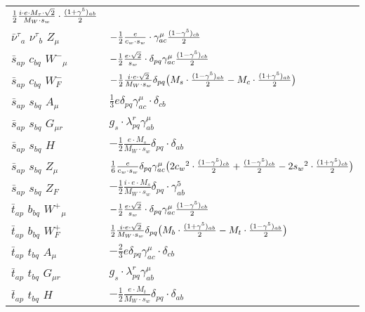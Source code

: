 \begin{center}
\begin{tabular}{|l|l|}
	$\frac{1}{2}\frac{ i \cdot e \cdot M_{\tau} \cdot\sqrt{2}}{ M_W \cdot s_w}\cdot {(1+\gamma^5)_{a b}\over 2} $\\[2mm]
$\bar{\nu}^\tau{}_{a }$ \phantom{-} $\nu^\tau{}_{b }$ \phantom{-} ${Z}_{\mu }$ \phantom{-}  &
	$-\frac{1}{2}\frac{ e}{ c_w \cdot s_w}\cdot \gamma_{a c}^\mu {(1-\gamma^5)_{c b}\over 2} $\\[2mm]
$\bar{s}{}_{a p }$ \phantom{-} $c{}_{b q }$ \phantom{-} $W^-{}_{\mu }$ \phantom{-}  &
	$-\frac{1}{2}\frac{ e \cdot\sqrt{2}}{ s_w}\cdot \delta_{p q} \gamma_{a c}^\mu {(1-\gamma^5)_{c b}\over 2} $\\[2mm]
$\bar{s}{}_{a p }$ \phantom{-} $c{}_{b q }$ \phantom{-} $W^-_F{}_{}$ \phantom{-}  &
	$-\frac{1}{2}\frac{ i \cdot e \cdot\sqrt{2}}{ M_W \cdot s_w}\delta_{p q} \big( M_s\cdot {(1-\gamma^5)_{a b}\over 2} - M_c\cdot {(1+\gamma^5)_{a b}\over 2} \big)$\\[2mm]
$\bar{s}{}_{a p }$ \phantom{-} $s{}_{b q }$ \phantom{-} ${A}_{\mu }$ \phantom{-}  &
	$\frac{1}{3} e\delta_{p q} \gamma_{a c}^\mu \cdot \delta_{c b} $\\[2mm]
$\bar{s}{}_{a p }$ \phantom{-} $s{}_{b q }$ \phantom{-} ${G}_{\mu r }$ \phantom{-}  &
	$ g_s\cdot \lambda_{p q}^r \gamma_{a b}^\mu $\\[2mm]
$\bar{s}{}_{a p }$ \phantom{-} $s{}_{b q }$ \phantom{-} ${H}_{}$ \phantom{-}  &
	$-\frac{1}{2}\frac{ e \cdot M_s}{ M_W \cdot s_w}\delta_{p q} \cdot \delta_{a b} $\\[2mm]
$\bar{s}{}_{a p }$ \phantom{-} $s{}_{b q }$ \phantom{-} ${Z}_{\mu }$ \phantom{-}  &
	$\frac{1}{6}\frac{ e}{ c_w \cdot s_w}\delta_{p q} \gamma_{a c}^\mu \big(2 c_w{}^2 \cdot {(1-\gamma^5)_{c b}\over 2} +{(1-\gamma^5)_{c b}\over 2} -2 s_w{}^2 \cdot {(1+\gamma^5)_{c b}\over 2} \big)$\\[2mm]
$\bar{s}{}_{a p }$ \phantom{-} $s{}_{b q }$ \phantom{-} $Z_F{}_{}$ \phantom{-}  &
	$-\frac{1}{2}\frac{ i \cdot e \cdot M_s}{ M_W \cdot s_w}\delta_{p q} \cdot \gamma_{a b}^5 $\\[2mm]
$\bar{t}{}_{a p }$ \phantom{-} $b{}_{b q }$ \phantom{-} $W^+{}_{\mu }$ \phantom{-}  &
	$-\frac{1}{2}\frac{ e \cdot\sqrt{2}}{ s_w}\cdot \delta_{p q} \gamma_{a c}^\mu {(1-\gamma^5)_{c b}\over 2} $\\[2mm]
$\bar{t}{}_{a p }$ \phantom{-} $b{}_{b q }$ \phantom{-} $W^+_F{}_{}$ \phantom{-}  &
	$\frac{1}{2}\frac{ i \cdot e \cdot\sqrt{2}}{ M_W \cdot s_w}\delta_{p q} \big( M_b\cdot {(1+\gamma^5)_{a b}\over 2} - M_t\cdot {(1-\gamma^5)_{a b}\over 2} \big)$\\[2mm]
$\bar{t}{}_{a p }$ \phantom{-} $t{}_{b q }$ \phantom{-} ${A}_{\mu }$ \phantom{-}  &
	$-\frac{2}{3} e\delta_{p q} \gamma_{a c}^\mu \cdot \delta_{c b} $\\[2mm]
$\bar{t}{}_{a p }$ \phantom{-} $t{}_{b q }$ \phantom{-} ${G}_{\mu r }$ \phantom{-}  &
	$ g_s\cdot \lambda_{p q}^r \gamma_{a b}^\mu $\\[2mm]
$\bar{t}{}_{a p }$ \phantom{-} $t{}_{b q }$ \phantom{-} ${H}_{}$ \phantom{-}  &
	$-\frac{1}{2}\frac{ e \cdot M_t}{ M_W \cdot s_w}\delta_{p q} \cdot \delta_{a b} $\\ \hline
\end{tabular}


\end{center}
